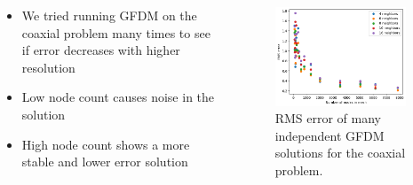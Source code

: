 \documentclass{beamer}
\begin{document}
\begin{frame}
\begin{columns}
    \begin{column}{0.5\linewidth}
    \begin{itemize}
        \item We tried running GFDM on the coaxial problem many times to see if error decreases with higher resolution
        \item Low node count causes noise in the solution
        \item High node count shows a more stable and lower error solution
    \end{itemize}
    \end{column}
    \begin{column}{0.5\linewidth}
    \begin{figure}[h]
        \centering
        \includegraphics[width=0.95\textwidth]{Figures/Coax_GFDM_Nodes_Neighbors_RMS.png}
        \caption{RMS error of many independent GFDM solutions for the coaxial problem.}
        \label{fig:coax_gfdm_nodes_neighbors}
    \end{figure}
    \end{column}
\end{columns}
\end{frame}

\end{document}
